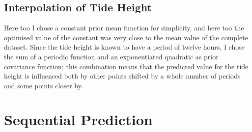 \documentclass{article}
\begin{document}
            \subsection{Interpolation of Tide Height}

                Here too I chose a constant prior mean function for simplicity, and here too the optimised value of the constant was very close to the mean value of the complete dataset. Since the tide height is known to have a period of twelve hours, I chose the sum of a periodic function and an exponentiated quadratic as prior covariance function; this combination means that the predicted value for the tide height is influenced both by other points shifted by a whole number of periods and some points closer by. %

    \section{Sequential Prediction}
\end{document}
